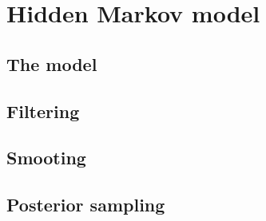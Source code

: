 \section{Hidden Markov model}
\subsection{The model}
\subsection{Filtering}
\subsection{Smooting}
\subsection{Posterior sampling}